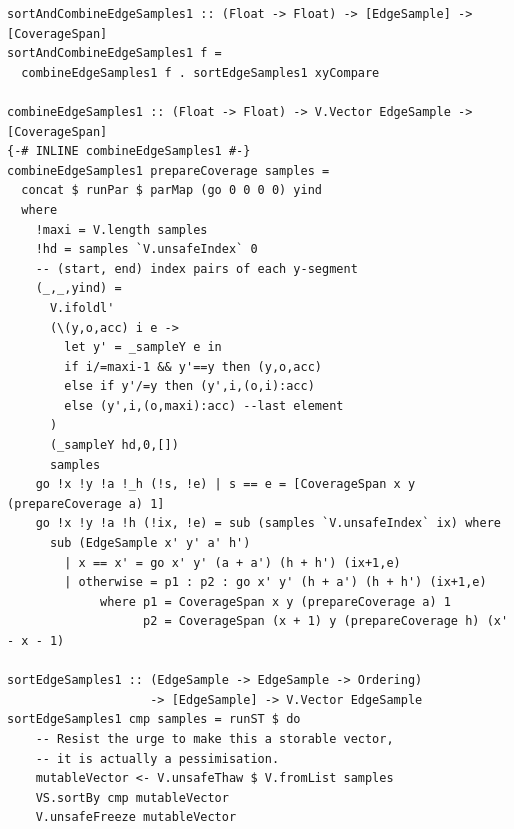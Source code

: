 \documentclass[12pt, a4paper]{article}
\begin{document}
\begin{lstlisting}[label={lst:combineindex}, caption={combineEdgeSamples with indexing}]
sortAndCombineEdgeSamples1 :: (Float -> Float) -> [EdgeSample] -> [CoverageSpan]
sortAndCombineEdgeSamples1 f =
  combineEdgeSamples1 f . sortEdgeSamples1 xyCompare

combineEdgeSamples1 :: (Float -> Float) -> V.Vector EdgeSample -> [CoverageSpan]
{-# INLINE combineEdgeSamples1 #-}
combineEdgeSamples1 prepareCoverage samples =
  concat $ runPar $ parMap (go 0 0 0 0) yind
  where
    !maxi = V.length samples
    !hd = samples `V.unsafeIndex` 0
    -- (start, end) index pairs of each y-segment
    (_,_,yind) =
      V.ifoldl'
      (\(y,o,acc) i e ->
        let y' = _sampleY e in
        if i/=maxi-1 && y'==y then (y,o,acc)
        else if y'/=y then (y',i,(o,i):acc)
        else (y',i,(o,maxi):acc) --last element
      )
      (_sampleY hd,0,[])
      samples
    go !x !y !a !_h (!s, !e) | s == e = [CoverageSpan x y (prepareCoverage a) 1]
    go !x !y !a !h (!ix, !e) = sub (samples `V.unsafeIndex` ix) where
      sub (EdgeSample x' y' a' h')
        | x == x' = go x' y' (a + a') (h + h') (ix+1,e)
        | otherwise = p1 : p2 : go x' y' (h + a') (h + h') (ix+1,e)
             where p1 = CoverageSpan x y (prepareCoverage a) 1
                   p2 = CoverageSpan (x + 1) y (prepareCoverage h) (x' - x - 1)

sortEdgeSamples1 :: (EdgeSample -> EdgeSample -> Ordering)
                    -> [EdgeSample] -> V.Vector EdgeSample
sortEdgeSamples1 cmp samples = runST $ do
    -- Resist the urge to make this a storable vector,
    -- it is actually a pessimisation.
    mutableVector <- V.unsafeThaw $ V.fromList samples
    VS.sortBy cmp mutableVector
    V.unsafeFreeze mutableVector
\end{lstlisting}
\end{document}
